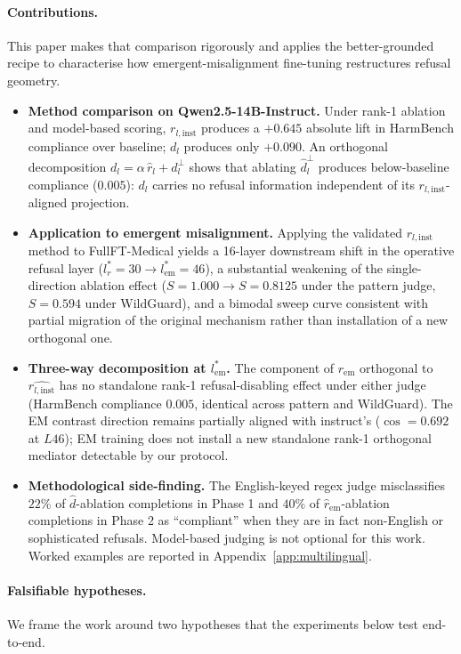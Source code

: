 \documentclass{article}
\newcommand{\rinst}{r_{l,\mathrm{inst}}}
\newcommand{\dinst}{d_{l}}
\newcommand{\rem}{r_{\mathrm{em}}}
\begin{document}
\paragraph{Contributions.} This paper makes that comparison
rigorously and applies the better-grounded recipe to characterise
how emergent-misalignment fine-tuning \citep{betley2025emergent}
restructures refusal geometry.

\begin{itemize}\itemsep0pt
\item \textbf{Method comparison on Qwen2.5-14B-Instruct.} Under
rank-1 ablation and model-based scoring, $\rinst$ produces a
$+0.645$ absolute lift in HarmBench compliance over baseline;
$\dinst$ produces only $+0.090$. An orthogonal decomposition
$\dinst = \alpha\,\hat{r}_{l} + d_{l}^{\perp}$ shows that ablating
$\hat{d}_{l}^{\perp}$ produces below-baseline compliance ($0.005$):
$\dinst$ carries no refusal information independent of its
$\rinst$-aligned projection.
\item \textbf{Application to emergent misalignment.} Applying the
validated $\rinst$ method to FullFT-Medical yields a 16-layer
downstream shift in the operative refusal layer
($l^{*}_r = 30 \rightarrow l^{*}_{\mathrm{em}} = 46$), a substantial
weakening of the single-direction ablation effect
($S=1.000 \rightarrow S=0.8125$ under the pattern judge,
$S=0.594$ under WildGuard), and a bimodal sweep curve consistent with partial migration of the original mechanism rather than installation of a new orthogonal one.
\item \textbf{Three-way decomposition at $l^{*}_{\mathrm{em}}$.} The
component of $\rem$ orthogonal to $\hat{\rinst}$ has no standalone
rank-1 refusal-disabling effect under either judge (HarmBench
compliance $0.005$, identical across pattern and WildGuard). The
EM contrast direction remains partially aligned with instruct's
($\cos = 0.692$ at $L46$); EM training does not install a new
standalone rank-1 orthogonal mediator detectable by our protocol.
\item \textbf{Methodological side-finding.} The English-keyed regex
judge misclassifies $22\%$ of
$\hat{d}$-ablation completions in Phase 1 and $40\%$ of
$\hat{r}_{\mathrm{em}}$-ablation completions in Phase 2 as
``compliant'' when they are in fact non-English or sophisticated
refusals. Model-based judging is not optional for this work.
Worked examples are reported in Appendix~\ref{app:multilingual}.
\end{itemize}

\paragraph{Falsifiable hypotheses.} We frame the work around two
hypotheses that the experiments below test end-to-end.
\end{document}
